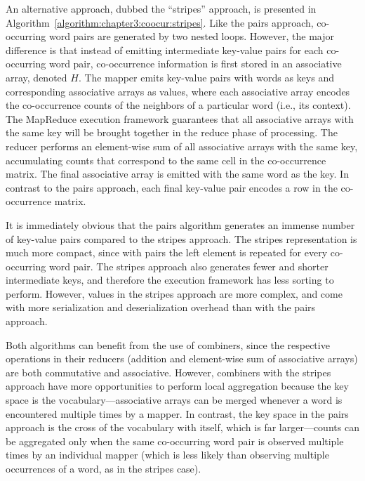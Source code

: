 \documentclass[11pt]{article}
\begin{document}

An alternative approach, dubbed the ``stripes'' approach, is presented
in Algorithm~\ref{algorithm:chapter3:coocur:stripes}.  Like the pairs
approach, co-occurring word pairs are generated by two nested loops.
However, the major difference is that instead of emitting intermediate
key-value pairs for each co-occurring word pair, co-occurrence
information is first stored in an associative array, denoted $H$.  The
mapper emits key-value pairs with words as keys and corresponding
associative arrays as values, where each associative array encodes the
co-occurrence counts of the neighbors of a particular word (i.e., its
context).  The MapReduce execution framework guarantees that all
associative arrays with the same key will be brought together in the
reduce phase of processing.  The reducer performs an element-wise sum
of all associative arrays with the same key, accumulating counts that
correspond to the same cell in the co-occurrence matrix.  The final
associative array is emitted with the same word as the key.  In
contrast to the pairs approach, each final key-value pair encodes a
row in the co-occurrence matrix.

It is immediately obvious that the pairs algorithm generates an
immense number of key-value pairs compared to the stripes approach.
The stripes representation is much more compact, since with pairs the
left element is repeated for every co-occurring word pair.  The
stripes approach also generates fewer and shorter intermediate keys,
and therefore the execution framework has less sorting to perform.
However, values in the stripes approach are more complex, and come
with more serialization and deserialization overhead than with the
pairs approach.

Both algorithms can benefit from the use of combiners, since the
respective operations in their reducers (addition and element-wise sum
of associative arrays) are both commutative and associative.  However,
combiners with the stripes approach have more opportunities to perform
local aggregation because the key space is the
vocabulary---associative arrays can be merged whenever a word is
encountered multiple times by a mapper.  In contrast, the key space in
the pairs approach is the cross of the vocabulary with itself, which
is far larger---counts can be aggregated only when the same
co-occurring word pair is observed multiple times by an individual
mapper (which is less likely than observing multiple occurrences of a
word, as in the stripes case).
\end{document}

